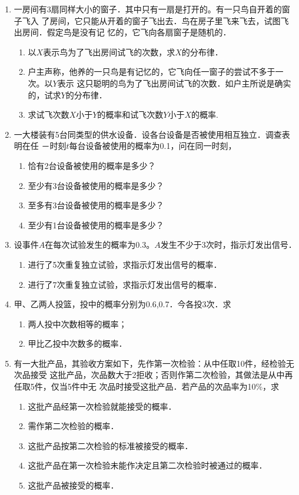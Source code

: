 \begin{enumerate}
    \item 一房间有3扇同样大小的窗子．其中只有一扇是打开的。有一只鸟自开着的窗子飞入
    了房间，它只能从开着的窗子飞出去．鸟在房子里飞来飞去，试图飞出房间．假定鸟是没有记
    忆的，它飞向各扇窗子是随机的．
    \begin{enumerate}
        \item 以$X$表示鸟为了飞出房间试飞的次数，求$X$的分布律．
        \item 户主声称，他养的一只鸟是有记忆的，它飞向任一窗子的尝试不多于一次。以$Y$表示
        这只聪明的鸟为了飞出房间试飞的次数．如户主所说是确实的，试求$Y$的分布律．
        \item 求试飞次数$X$小于$Y$的概率和试飞次数$Y$小于$X$的概率.
    \end{enumerate}


    \item 一大楼装有5台同类型的供水设备．设各台设备是否被使用相互独立．调查表明在任
    －时刻$t$每台设备被使用的概率为0.1，问在同一时刻，
    \begin{enumerate}
        \item 恰有2台设备被使用的概率是多少？
        \item 至少有3台设备被使用的概率是多少？
        \item 至多有3台设备被使用的概率是多少？
        \item 至少有1台设备被使用的概率是多少？
    \end{enumerate}


    \item 设事件$A$在每次试验发生的概率为0.3。$A$发生不少于3次时，指示灯发出信号．
    \begin{enumerate}
        \item 进行了5次重复独立试验，求指示灯发出信号的概率．
        \item 进行了7次重复独立试验，求指示灯发出信号的概率．
    \end{enumerate}


    \item 甲、乙两人投篮，投中的概率分别为0.6,0.7．今各投3次．求
    \begin{enumerate}
        \item 两人投中次数相等的概率；
        \item 甲比乙投中次数多的概率．
    \end{enumerate}


    \item 有一大批产品，其验收方案如下，先作第一次检验：从中任取10件，经检验无次品接受
    这批产品，次品数大于2拒收；否则作第二次检验，其做法是从中再任取5件，仅当5件中无
    次品时接受这批产品．若产品的次品率为10\%，求
    \begin{enumerate}
        \item 这批产品经第一次检验就能接受的概率．
        \item 需作第二次检验的概率．
        \item 这批产品按第二次检验的标准被接受的概率．
        \item 这批产品在第一次检验未能作决定且第二次检验时被通过的概率．
        \item 这批产品被接受的概率．
    \end{enumerate}



\end{enumerate}
